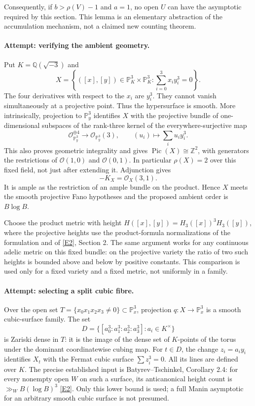 \documentclass[11pt,a4paper]{article}
\newcommand{\Z}{\mathbb{Z}}
\newcommand{\Q}{\mathbb{Q}}
\newcommand{\PP}{\mathbb P}
\newcommand{\eref}[2]{\hyperlink{extra:#1:#2}{[E#2]}}
\numberwithin{equation}{section}
\begin{document}
Consequently, if $b>\rho(V)-1$ and $a=1$, no open $U$ can have the
asymptotic required by this section. This lemma is an elementary
abstraction of the accumulation mechanism, not a claimed new counting
theorem.

\paragraph{Attempt: verifying the ambient geometry.}
Put $K=\Q(\sqrt{-3})$ and
\begin{equation}\label{159:variety}
 X=\left\{([x],[y])\in\PP^3_K\times\PP^3_K:
           \sum_{i=0}^3x_i y_i^3=0\right\}.
\end{equation}
The four derivatives with respect to the $x_i$ are $y_i^3$. They cannot
vanish simultaneously at a projective point. Thus the hypersurface is
smooth. More intrinsically, projection to $\PP^3_y$ identifies $X$ with
the projective bundle of one-dimensional subspaces of the rank-three
kernel of the everywhere-surjective map
\[
 \mathcal O_{\PP^3_y}^{\oplus4}\longrightarrow
 \mathcal O_{\PP^3_y}(3),\qquad
 (u_i)\longmapsto\sum_i u_i y_i^3.
\]
This also proves geometric integrality and gives
$\operatorname{Pic}(X)\cong\Z^2$, with generators the restrictions of
$\mathcal O(1,0)$ and $\mathcal O(0,1)$. In particular $\rho(X)=2$ over
this fixed field, not just after extending it. Adjunction gives
\begin{equation}\label{159:anticanonical}
 -K_X=\mathcal O_X(3,1).
\end{equation}
It is ample as the restriction of an ample bundle on the product. Hence
$X$ meets the smooth projective Fano hypotheses and the proposed ambient
order is $B\log B$.

Choose the product metric with height
$H([x],[y])=H_3([x])^3H_3([y])$, where the projective heights use the
product-formula normalizations of the formulation and of
\eref{159}{2}, Section 2. The same argument works for any continuous
adelic metric on this fixed bundle: on the projective variety the ratio
of two such heights is bounded above and below by positive constants.
This comparison is used only for a fixed variety and a fixed metric, not
uniformly in a family.

\paragraph{Attempt: selecting a split cubic fibre.}
Over the open set $T=\{x_0x_1x_2x_3\ne0\}\subset\PP^3_x$, projection
$q:X\to\PP^3_x$ is a smooth cubic-surface family. The set
\[
 D=\{[a_0^3:a_1^3:a_2^3:a_3^3]:a_i\in K^\times\}
\]
is Zariski dense in $T$: it is the image of the dense set of $K$-points
of the torus under the dominant coordinatewise cubing map. For $t\in D$,
the change $z_i=a_i y_i$ identifies $X_t$ with the Fermat cubic surface
$\sum z_i^3=0$. All its lines are defined over $K$. The precise
established input is Batyrev--Tschinkel, Corollary 2.4: for every nonempty
open $W$ on such a surface, its anticanonical height count is
$\gg_W B(\log B)^3$ \eref{159}{2}. Only this lower bound is used; a full
Manin asymptotic for an arbitrary smooth cubic surface is not presumed.
\end{document}
